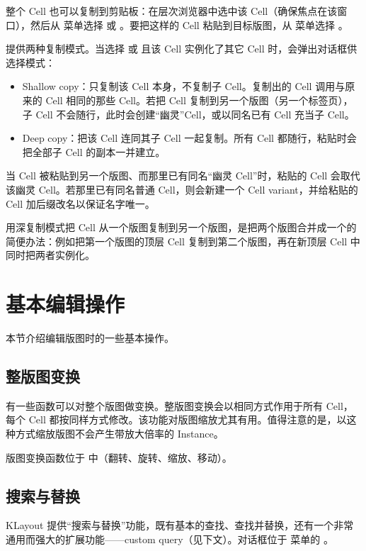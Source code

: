 整个 Cell 也可以复制到剪贴板：在层次浏览器中选中该 Cell（确保焦点在该窗口），然后从  菜单选择  或 。要把这样的 Cell 粘贴到目标版图，从  菜单选择 。

提供两种复制模式。当选择  或  且该 Cell 实例化了其它 Cell 时，会弹出对话框供选择模式：

\begin{itemize}
\item Shallow copy：只复制该 Cell 本身，不复制子 Cell。复制出的 Cell 调用与原来的 Cell 相同的那些 Cell。若把 Cell 复制到另一个版图（另一个标签页），子 Cell 不会随行，此时会创建“幽灵”Cell，或以同名已有 Cell 充当子 Cell。
\item Deep copy：把该 Cell 连同其子 Cell 一起复制。所有 Cell 都随行，粘贴时会把全部子 Cell 的副本一并建立。
\end{itemize}

当 Cell 被粘贴到另一个版图、而那里已有同名“幽灵 Cell”时，粘贴的 Cell 会取代该幽灵 Cell。若那里已有同名普通 Cell，则会新建一个 Cell variant，并给粘贴的 Cell 加后缀改名以保证名字唯一。

用深复制模式把 Cell 从一个版图复制到另一个版图，是把两个版图合并成一个的简便办法：例如把第一个版图的顶层 Cell 复制到第二个版图，再在新顶层 Cell 中同时把两者实例化。

\section{基本编辑操作}\label{sec:editor_operations}

本节介绍编辑版图时的一些基本操作。

\subsection{整版图变换}\label{sec:layout_transforms}

有一些函数可以对整个版图做变换。整版图变换会以相同方式作用于所有 Cell，每个 Cell 都按同样方式修改。该功能对版图缩放尤其有用。值得注意的是，以这种方式缩放版图不会产生带放大倍率的 Instance。

版图变换函数位于  中（翻转、旋转、缩放、移动）。

\subsection{搜索与替换}\label{sec:search_replace}

KLayout 提供“搜索与替换”功能，既有基本的查找、查找并替换，还有一个非常通用而强大的扩展功能——custom query（见下文）。对话框位于  菜单的 。

